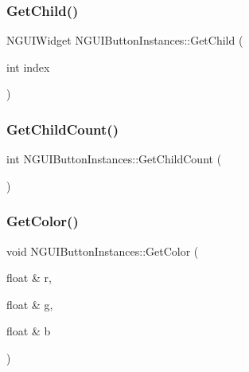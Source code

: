\subsubsection{\texorpdfstring{Get\+Child()}{GetChild()}\hspace{0.1cm}{\footnotesize\ttfamily [2/2]}}
{\footnotesize\ttfamily N\+G\+U\+I\+Widget N\+G\+U\+I\+Button\+Instances\+::\+Get\+Child (\begin{DoxyParamCaption}\item[{int}]{index }\end{DoxyParamCaption})}

\hypertarget{class_n_g_u_i_button_instances_a6fc18079baf23179bb3f6323b9ce7ed9}{}\label{class_n_g_u_i_button_instances_a6fc18079baf23179bb3f6323b9ce7ed9} 
\subsubsection{\texorpdfstring{Get\+Child\+Count()}{GetChildCount()}}
{\footnotesize\ttfamily int N\+G\+U\+I\+Button\+Instances\+::\+Get\+Child\+Count (\begin{DoxyParamCaption}{ }\end{DoxyParamCaption})}

\hypertarget{class_n_g_u_i_button_instances_aa6dabb682018d149816aa77a64614a1c}{}\label{class_n_g_u_i_button_instances_aa6dabb682018d149816aa77a64614a1c} 
\subsubsection{\texorpdfstring{Get\+Color()}{GetColor()}}
{\footnotesize\ttfamily void N\+G\+U\+I\+Button\+Instances\+::\+Get\+Color (\begin{DoxyParamCaption}\item[{float \&}]{r,  }\item[{float \&}]{g,  }\item[{float \&}]{b }\end{DoxyParamCaption})}

\hypertarget{class_n_g_u_i_button_instances_a6fe04e84ef1752d90cfa988c1860dfc2}{}\label{class_n_g_u_i_button_instances_a6fe04e84ef1752d90cfa988c1860dfc2} 

